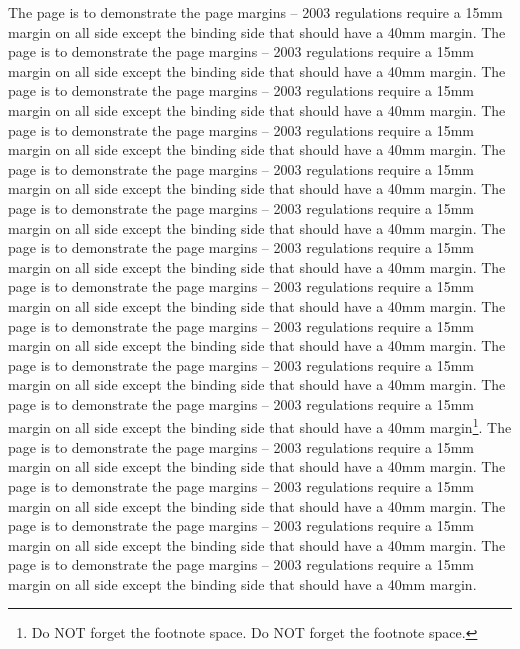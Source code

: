 \documentclass[12pt,MSc]{muthesis}
\begin{document}
The page is to demonstrate the page margins -- 2003 regulations
require a 15mm margin on all side except the binding side that
should have a 40mm margin. The page is to demonstrate the page
margins -- 2003 regulations require a 15mm margin on all side
except the binding side that should have a 40mm margin. The page
is to demonstrate the page margins -- 2003 regulations require a
15mm margin on all side except the binding side that should have a
40mm margin. The page is to demonstrate the page margins -- 2003
regulations require a 15mm margin on all side except the binding
side that should have a 40mm margin. The page is to demonstrate
the page margins -- 2003 regulations require a 15mm margin on all
side except the binding side that should have a 40mm margin. The
page is to demonstrate the page margins -- 2003 regulations
require a 15mm margin on all side except the binding side that
should have a 40mm margin. The page is to demonstrate the page
margins -- 2003 regulations require a 15mm margin on all side
except the binding side that should have a 40mm margin. The page
is to demonstrate the page margins -- 2003 regulations require a
15mm margin on all side except the binding side that should have a
40mm margin. The page is to demonstrate the page margins -- 2003
regulations require a 15mm margin on all side except the binding
side that should have a 40mm margin. The page is to demonstrate
the page margins -- 2003 regulations require a 15mm margin on all
side except the binding side that should have a 40mm margin. The
page is to demonstrate the page margins -- 2003 regulations
require a 15mm margin on all side except the binding side that
should have a 40mm margin\footnote{Do NOT forget the footnote
space. Do NOT forget the footnote space.}. The page is to
demonstrate the page margins -- 2003 regulations require a 15mm
margin on all side except the binding side that should have a 40mm
margin. The page is to demonstrate the page margins -- 2003
regulations require a 15mm margin on all side except the binding
side that should have a 40mm margin. The page is to demonstrate
the page margins -- 2003 regulations require a 15mm margin on all
side except the binding side that should have a 40mm margin. The
page is to demonstrate the page margins -- 2003 regulations
require a 15mm margin on all side except the binding side that
should have a 40mm margin.
\end{document}
